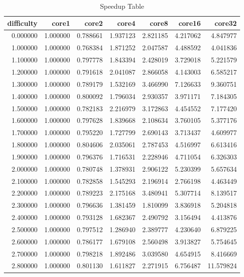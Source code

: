 \begin{table}
\caption{Speedup Table}
\label{tab:speedup}
\begin{tabular}{rrrrrrr}
\toprule
difficulty & core1 & core2 & core4 & core8 & core16 & core32 \\
\midrule
0.000000 & 1.000000 & 0.788661 & 1.937123 & 2.821185 & 4.217062 & 4.847977 \\
1.000000 & 1.000000 & 0.768384 & 1.871252 & 2.047587 & 4.488592 & 4.041836 \\
1.100000 & 1.000000 & 0.797778 & 1.843394 & 2.428019 & 3.729018 & 5.221579 \\
1.200000 & 1.000000 & 0.791618 & 2.041087 & 2.866058 & 4.143003 & 6.585217 \\
1.300000 & 1.000000 & 0.789179 & 1.532169 & 3.466990 & 7.126633 & 9.360751 \\
1.400000 & 1.000000 & 0.800092 & 1.796034 & 2.930357 & 3.971171 & 7.184305 \\
1.500000 & 1.000000 & 0.782183 & 2.216979 & 3.172863 & 4.454552 & 7.177420 \\
1.600000 & 1.000000 & 0.797628 & 1.839668 & 2.108634 & 3.760105 & 5.377176 \\
1.700000 & 1.000000 & 0.795220 & 1.727799 & 2.690143 & 3.713437 & 4.609977 \\
1.800000 & 1.000000 & 0.804606 & 2.035061 & 2.787453 & 4.516997 & 6.613416 \\
1.900000 & 1.000000 & 0.796376 & 1.716531 & 2.228946 & 4.711054 & 6.326303 \\
2.000000 & 1.000000 & 0.780748 & 1.378931 & 2.906122 & 5.230399 & 5.657634 \\
2.100000 & 1.000000 & 0.782858 & 1.545293 & 2.196914 & 2.766198 & 4.463449 \\
2.200000 & 1.000000 & 0.789223 & 2.175168 & 3.480941 & 5.307714 & 8.139517 \\
2.300000 & 1.000000 & 0.796636 & 1.381459 & 1.810099 & 3.836918 & 5.204818 \\
2.400000 & 1.000000 & 0.793128 & 1.682367 & 2.490792 & 3.156494 & 4.413876 \\
2.500000 & 1.000000 & 0.797512 & 1.286940 & 2.389777 & 4.230640 & 6.879225 \\
2.600000 & 1.000000 & 0.786177 & 1.679108 & 2.560498 & 3.913827 & 5.754645 \\
2.700000 & 1.000000 & 0.798218 & 1.892486 & 3.039580 & 4.654915 & 8.416669 \\
2.800000 & 1.000000 & 0.801130 & 1.611827 & 2.271915 & 6.756487 & 11.579824 \\

\end{tabular}
\end{table}
